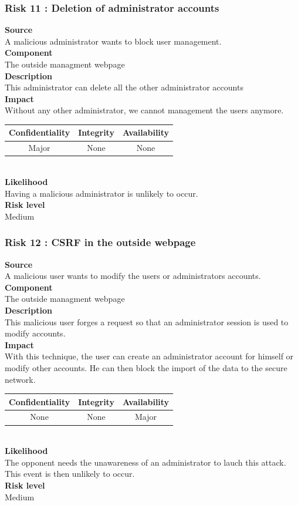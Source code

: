 \documentclass[a4paper,11pt]{article}
\begin{document}
\subsubsection{Risk 11 : Deletion of administrator accounts }
\textbf{Source} \\A malicious administrator wants to block user management.\\
\textbf{Component} \\The outside managment webpage\\
\textbf{Description}\\This administrator can delete all the other administrator accounts \\
\textbf{Impact}\\
Without any other administrator, we cannot management the users anymore.\\
\begin{tabular}{|c|c|c|}
\hline
Confidentiality & Integrity & Availability \\
\hline
Major & None & None \\
\hline
\end{tabular}\\
\textbf{Likelihood}\\ Having a malicious administrator is unlikely to occur.\\
\textbf{Risk level}\\Medium\\

\subsubsection{Risk 12 : CSRF in the outside webpage}
\textbf{Source} \\A malicious user wants to modify the users or administrators accounts.\\
\textbf{Component} \\The outside managment webpage\\
\textbf{Description}\\This malicious user forges a request so that an administrator session is used to modify accounts.   \\
\textbf{Impact}\\
With this technique, the user can create an administrator account for himself or modify other accounts. He can then block the import of the data to the secure network. \\
\begin{tabular}{|c|c|c|}
\hline
Confidentiality & Integrity & Availability \\
\hline
None & None & Major \\
\hline
\end{tabular}\\
\textbf{Likelihood}\\The opponent needs the unawareness of an administrator to lauch this attack. This event is then unlikely to occur.\\
\textbf{Risk level}\\Medium\\
\end{document}
